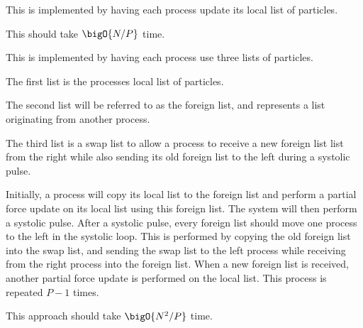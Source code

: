 \begin{description}[style=nextline]
\item[individual\_operation]
    This is implemented by having each process update its local list
    of particles.

    This should take $\bigO{N/P}$ time.

\item[pair\_operation]
    This is implemented by having each process use three lists of particles.

    The first list is the processes local list of particles.

    The second list will be referred to as the foreign list, and
    represents a list originating from another process.

    The third list is a swap list to allow a process to receive a new
    foreign list list from the right
    while also sending its old foreign list to the left
    during a systolic pulse.

    Initially, a process will copy its local list to the foreign list
    and perform a partial force update on its local list using this
    foreign list.
    The system will then perform a systolic pulse.
    After a systolic pulse, every foreign list should move one process
    to the left in the systolic loop.
    This is performed by copying the old foreign list into the
    swap list, and sending the swap list to the left process while
    receiving from the right process into the foreign list.
    When a new foreign list is received, another partial force update
    is performed on the local list.
    This process is repeated $P-1$ times.

    This approach should take $\bigO{N^2/P}$ time.

\end  {description}
